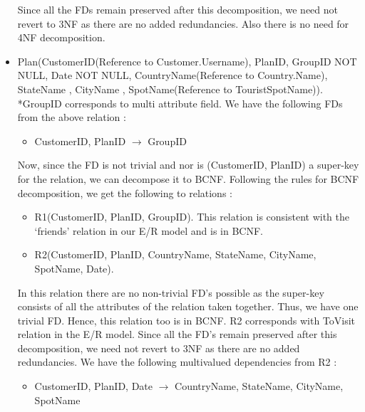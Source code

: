 \documentclass[11pt]{article}
\begin{document}
\begin{itemize}
Since  all the FDs remain preserved after this decomposition, we need not revert to 3NF as there are no added redundancies. Also there is no need for 4NF decomposition.

\item Plan(CustomerID(Reference to Customer.Username), PlanID, GroupID NOT NULL, Date NOT NULL,  CountryName(Reference to Country.Name), StateName , CityName , SpotName(Reference to TouristSpotName)). \newline
*GroupID corresponds to multi attribute field.\newline \newline
We have the following FDs from the above relation :
\begin{itemize}
\item CustomerID, PlanID $\rightarrow$ GroupID
\end{itemize}

Now, since the FD is not trivial and nor is (CustomerID, PlanID) a super-key for the relation, we can decompose it to BCNF. Following the rules for BCNF decomposition, we get the following to relations :
\begin{itemize}
\item R1(CustomerID, PlanID, GroupID).
This relation is consistent with the ‘friends’ relation in our E/R model and is in BCNF.
\item R2(CustomerID, PlanID, CountryName, StateName, CityName, SpotName, Date).
\end{itemize}

In this relation there are no non-trivial FD’s possible as the super-key consists of all the attributes of the relation taken together. Thus, we have one trivial FD. Hence, this relation too is in BCNF. R2 corresponds with ToVisit relation in the E/R model. \newline
Since  all the FD’s remain preserved after this decomposition, we need not revert to 3NF as there are no added redundancies. \newline
We have the following multivalued dependencies from R2 :
\begin{itemize}
\item CustomerID, PlanID, Date $\rightarrow$ CountryName, StateName, CityName, SpotName
\end{itemize}


\end{itemize}
\end{document}
